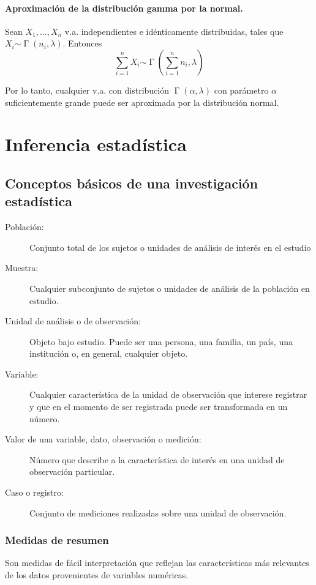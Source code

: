 \documentclass[11pt]{article}
\theoremstyle{plain}
\theoremstyle{definition}
\theoremstyle{remark}
\newcommand{\dists}[1]{\ensuremath{\operatorname{#1}}}  %
\newcommand{\dist}[1]{\ensuremath{\sim \operatorname{#1}}}  %
\begin{document}
      \paragraph{Aproximación de la distribución gamma por la normal.}
      Sean $X_1, \dots, X_n$ v.a. independientes e idénticamente distribuidas, tales que $X_i \dist{\Gamma}(n_i,\lambda)$. Entonces
      \[ \sum_{i=1}^n X_i \dist{\Gamma}\left(\sum_{i=1}^n n_i,\lambda \right) \]

      Por lo tanto, cualquier v.a. con distribución $\dists{\Gamma}(\alpha,\lambda)$ con parámetro $\alpha$suficientemente grande puede ser aproximada por la distribución normal.

\section{Inferencia estadística}

  \subsection{Conceptos básicos de una investigación estadística}

    \begin{description}
      \item[Población:] Conjunto total de los sujetos o unidades de análisis de interés en el estudio
      \item[Muestra:] Cualquier subconjunto de sujetos o unidades de análisis de la población en estudio.
      \item[Unidad de análisis o de observación:] Objeto bajo estudio. Puede ser una persona, una familia, un país, una institución o, en general, cualquier objeto.
      \item[Variable:] Cualquier característica de la unidad de observación que interese registrar y que en el momento de ser registrada puede ser transformada en un número.
      \item[Valor de una variable, dato, observación o medición:] Número que describe a la característica de interés en una unidad de observación particular. 
      \item[Caso o registro:] Conjunto de mediciones realizadas sobre una unidad de observación.
    \end{description}

    \subsubsection{Medidas de resumen}
      Son medidas de fácil interpretación que reflejan las características más relevantes de los datos provenientes de variables numéricas.
\end{document}
